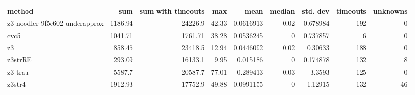 \begin{tabular}{lrrrrrrrr}
\hline
 method                         &     sum &   sum with timeouts &   max &      mean &   median &   std. dev &   timeouts &   unknowns \\
\hline
 z3-noodler-9f5e602-underapprox & 1186.94 &            24226.9  & 42.33 & 0.0616913 &     0.02 &   0.678984 &        192 &          0 \\
 cvc5                           & 1041.71 &             1761.71 & 38.28 & 0.0536245 &     0    &   0.737857 &          6 &          0 \\
 z3                             &  858.46 &            23418.5  & 12.94 & 0.0446092 &     0.02 &   0.30633  &        188 &          0 \\
 z3strRE                        &  293.09 &            16133.1  &  9.95 & 0.015186  &     0    &   0.174878 &        132 &          8 \\
 z3-trau                        & 5587.7  &            20587.7  & 77.01 & 0.289413  &     0.03 &   3.3593   &        125 &          0 \\
 z3str4                         & 1912.93 &            17752.9  & 49.88 & 0.0991155 &     0    &   1.12915  &        132 &         46 \\
\hline
\end{tabular}
